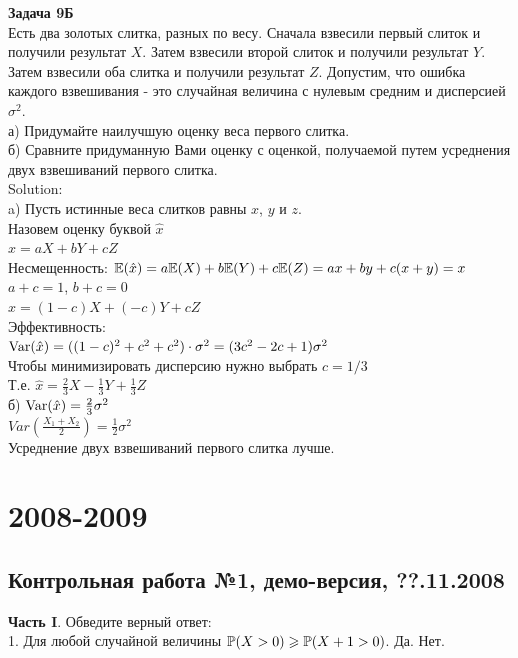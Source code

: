 \documentclass[12pt, a4paper]{article}\usepackage[]{graphicx}\usepackage[]{color}
\begin{document}
\textbf{Задача 9Б} \\
Есть два золотых слитка, разных по весу. Сначала взвесили первый слиток и получили результат $X$. Затем взвесили второй слиток и получили результат $Y$. Затем взвесили оба слитка и получили результат $Z$. Допустим, что ошибка каждого взвешивания - это случайная величина с нулевым средним и дисперсией $\sigma^{2}$. \\
а) Придумайте наилучшую оценку веса первого слитка. \\
б) Сравните придуманную Вами оценку с оценкой, получаемой путем усреднения двух взвешиваний первого слитка. \\
Solution: \\
a) Пусть истинные веса слитков равны $x$, $y$ и $z$. \\
Назовем оценку буквой $\hat{x}$ \\
$\hat{x}=aX+bY+cZ$ \\
Несмещенность: $\E(\hat{x})=a\E(X)+b\E(Y)+c\E(Z)=ax+by+c(x+y)=x$ \\
$a+c=1$, $b+c=0$ \\
$\hat{x}=(1-c)X+(-c)Y+cZ$ \\
Эффективность: \\
$\Var(\hat{x})=((1-c)^{2}+c^{2}+c^{2})\cdot \sigma^{2}=(3c^{2}-2c+1)\sigma^{2}$ \\
Чтобы минимизировать дисперсию нужно выбрать $c=1/3$ \\
Т.е. $\hat{x}=\frac{2}{3}X-\frac{1}{3}Y+\frac{1}{3}Z$ \\
б) $\Var(\hat{x})=\frac{2}{3}\sigma^{2}$ \\
$Var\left(\frac{X_{1}+X_{2}}{2}\right)=\frac{1}{2}\sigma^{2}$ \\
Усреднение двух взвешиваний первого слитка лучше. \\

\section{2008-2009}

\subsection{Контрольная работа №1, демо-версия, ??.11.2008}

\textbf{Часть I}. Обведите верный ответ: \\

1. Для любой случайной величины $\P(X>0)\ge \P(X+1>0)$. Да. Нет. \\
\end{document}
